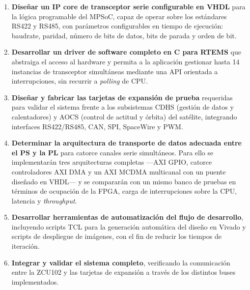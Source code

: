 \begin{enumerate}
    \item \textbf{Diseñar un IP core de transceptor serie configurable en VHDL} para la lógica
    programable del MPSoC, capaz de operar sobre los estándares RS422 y RS485, con
    parámetros configurables en tiempo de ejecución: baudrate, paridad, número de bits de
    datos, bits de parada y orden de bit.

    \item \textbf{Desarrollar un driver de software completo en C para RTEMS} que abstraiga el
    acceso al hardware y permita a la aplicación gestionar hasta 14 instancias de transceptor
    simultáneas mediante una API orientada a interrupciones, sin recurrir a \textit{polling} de CPU.

    \item \textbf{Diseñar y fabricar las tarjetas de expansión de prueba} requeridas para validar el
    sistema frente a los subsistemas CDHS (gestión de datos y calentadores) y AOCS (control
    de actitud y órbita) del satélite, integrando interfaces RS422/RS485, CAN, SPI, SpaceWire
    y PWM.

    \item \textbf{Determinar la arquitectura de transporte de datos adecuada entre el PS y la PL}
    para catorce canales serie simultáneos. Para ello se implementarán tres arquitecturas
    completas ---AXI GPIO, catorce controladores AXI DMA y un AXI MCDMA multicanal con un puente
    diseñado en VHDL--- y se compararán con un mismo banco de pruebas en términos de ocupación de
    la FPGA, carga de interrupciones sobre la CPU, latencia y \textit{throughput}.

    \item \textbf{Desarrollar herramientas de automatización del flujo de desarrollo}, incluyendo
    scripts TCL para la generación automática del diseño en Vivado y scripts de despliegue de
    imágenes, con el fin de reducir los tiempos de iteración.

    \item \textbf{Integrar y validar el sistema completo}, verificando la comunicación entre la
    ZCU102 y las tarjetas de expansión a través de los distintos buses implementados.
\end{enumerate}
